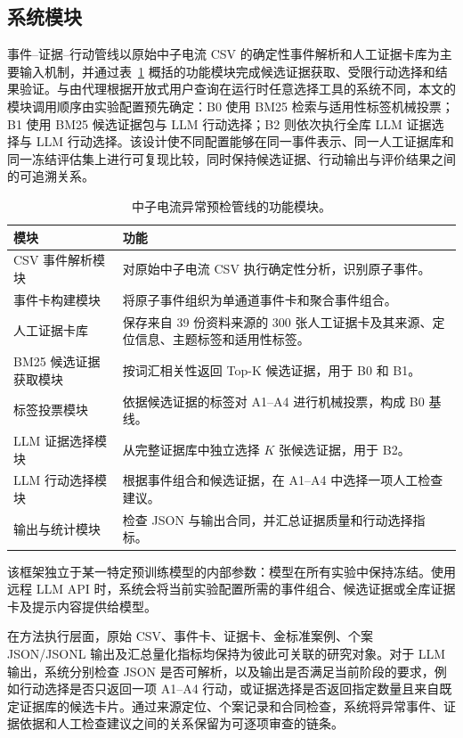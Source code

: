 \subsection{系统模块}

事件--证据--行动管线以原始中子电流 CSV 的确定性事件解析和人工证据卡库为主要输入机制，并通过表~\ref{tab:modules} 概括的功能模块完成候选证据获取、受限行动选择和结果验证。与由代理根据开放式用户查询在运行时任意选择工具的系统不同，本文的模块调用顺序由实验配置预先确定：B0 使用 BM25 检索与适用性标签机械投票；B1 使用 BM25 候选证据包与 LLM 行动选择；B2 则依次执行全库 LLM 证据选择与 LLM 行动选择。该设计使不同配置能够在同一事件表示、同一人工证据库和同一冻结评估集上进行可复现比较，同时保持候选证据、行动输出与评价结果之间的可追溯关系。

\begin{table}[t]
\centering
\small
\caption{中子电流异常预检管线的功能模块。}
\label{tab:modules}
\setlength{\tabcolsep}{3pt}
\begin{tabular}{p{} p{}}
\hline
\textbf{模块} & \textbf{功能} \\
\hline
CSV 事件解析模块 & 对原始中子电流 CSV 执行确定性分析，识别原子事件。 \\
事件卡构建模块 & 将原子事件组织为单通道事件卡和聚合事件组合。 \\
人工证据卡库 & 保存来自 39 份资料来源的 300 张人工证据卡及其来源、定位信息、主题标签和适用性标签。 \\
BM25 候选证据获取模块 & 按词汇相关性返回 Top-K 候选证据，用于 B0 和 B1。 \\
标签投票模块 & 依据候选证据的标签对 A1--A4 进行机械投票，构成 B0 基线。 \\
LLM 证据选择模块 & 从完整证据库中独立选择 \(K\) 张候选证据，用于 B2。 \\
LLM 行动选择模块 & 根据事件组合和候选证据，在 A1--A4 中选择一项人工检查建议。 \\
输出与统计模块 & 检查 JSON 与输出合同，并汇总证据质量和行动选择指标。 \\
\hline
\end{tabular}
\end{table}

该框架独立于某一特定预训练模型的内部参数：模型在所有实验中保持冻结。使用远程 LLM API 时，系统会将当前实验配置所需的事件组合、候选证据或全库证据卡及提示内容提供给模型。

在方法执行层面，原始 CSV、事件卡、证据卡、金标准案例、个案 JSON/JSONL 输出及汇总量化指标均保持为彼此可关联的研究对象。对于 LLM 输出，系统分别检查 JSON 是否可解析，以及输出是否满足当前阶段的要求，例如行动选择是否只返回一项 A1--A4 行动，或证据选择是否返回指定数量且来自既定证据库的候选卡片。通过来源定位、个案记录和合同检查，系统将异常事件、证据依据和人工检查建议之间的关系保留为可逐项审查的链条。

